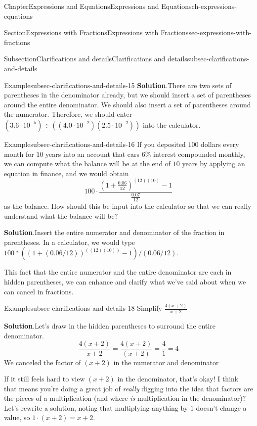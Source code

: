\documentclass[twoside,11pt,]{book}
\newcommand{\blocktitlefont}{\relax}
\numberwithin{equation}{chapter}
\begin{document}
\begin{chapterptx}{Chapter}{Expressions and Equations}{}{Expressions and Equations}{}{}{ch-expressions-equations}
\begin{sectionptx}{Section}{Expressions with Fractions}{}{Expressions with Fractions}{}{}{sec-expressions-with-fractions}
\begin{subsectionptx}{Subsection}{Clarifications and details}{}{Clarifications and details}{}{}{subsec-clarifications-and-details}
\begin{example}{Example}{}{subsec-clarifications-and-details-15}
\noindent\textbf{\blocktitlefont Solution}.\hypertarget{subsec-clarifications-and-details-15-2}{}\quad{}There are two sets of parentheses in the denominator already, but we should insert a set of parentheses around the entire denominator. We should also insert a set of parentheses around the numerator. Therefore, we should enter \((3.6 \cdot 10^{-5}) \div ((4.0 \cdot 10^{-2})(2.5 \cdot 10^{-2}))\) into the calculator.%
\end{example}
\begin{example}{Example}{}{subsec-clarifications-and-details-16}%
If you deposited \(100\) dollars every month for \(10\) years into an account that ears \(6\%\) interest compounded monthly, we can compute what the balance will be at the end of \(10\) years by applying an equation in finance, and we would obtain%
\begin{equation*}
100 \cdot \frac{(1+\frac{0.06}{12})^{(12)(10)}-1}{\frac{0.07}{12}}
\end{equation*}
as the balance. How should this be input into the calculator so that we can really understand what the balance will be?%
\par\smallskip%
\noindent\textbf{\blocktitlefont Solution}.\hypertarget{subsec-clarifications-and-details-16-2}{}\quad{}Insert the entire numerator and denominator of the fraction in parentheses. In a calculator, we would type \(100 * ((1+(0.06/12))^((12)(10))-1) / (0.06/12)\).%
\end{example}
This fact that the entire numerator and the entire denominator are each in hidden parentheses, we can enhance and clarify what we've said about when we can cancel in fractions.%
\begin{example}{Example}{}{subsec-clarifications-and-details-18}%
Simplify \(\frac{4(x+2)}{x+2}\)%
\par\smallskip%
\noindent\textbf{\blocktitlefont Solution}.\hypertarget{subsec-clarifications-and-details-18-2}{}\quad{}Let's draw in the hidden parentheses to surround the entire denominator.%
\begin{equation*}
\frac{4(x+2)}{x+2} = \frac{4(x+2)}{(x+2)} = \frac41 = 4
\end{equation*}
We canceled the factor of \((x+2)\) in the numerator and denominator%
\par
If it still feels hard to view \((x+2)\) in the denominator, that's okay! I think that means you're doing a great job of \emph{really} digging into the idea that factors are the pieces of a multiplication (and where \emph{is} multiplication in the denominator)? Let's rewrite a solution, noting that multiplying anything by \(1\) doesn't change a value, so \(1 \cdot (x+2) = x+2\).%

\end{example}
\end{subsectionptx}
\end{sectionptx}
\end{chapterptx}
\end{document}
